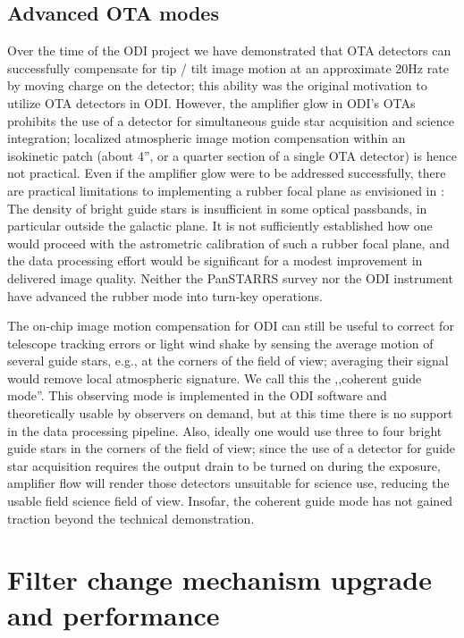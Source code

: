 \documentclass[]{spieman}
\begin{document}
\subsection{Advanced OTA modes}

Over the time of the ODI project we have demonstrated that OTA detectors can
successfully compensate for tip / tilt image motion at an approximate 20Hz rate 
by moving charge on the detector; this ability was the original motivation to  
utilize OTA detectors in ODI.  However, the amplifier glow in ODI's OTAs prohibits
the use of a detector for simultaneous guide star acquisition and science integration;
localized atmospheric image motion compensation within an
isokinetic patch (about 4'', or a quarter section of a single OTA detector) is hence not
practical. Even if the amplifier glow were to be addressed successfully, there are practical
limitations to implementing a rubber focal plane as envisioned in \cite{tonry2002}:
The density of  bright guide stars is insufficient in some  optical passbands,
in particular outside the galactic plane. It is not sufficiently established how
one would proceed with the astrometric calibration of such a rubber focal plane, and the
data processing effort would be significant for a modest improvement in
delivered image quality. Neither the PanSTARRS survey nor the ODI
instrument have advanced the rubber mode into turn-key operations.

The on-chip image motion compensation for ODI can still be useful to correct for telescope tracking 
errors or light wind shake by sensing the average motion of several guide stars, e.g., at the corners of the field 
of view; averaging their signal would remove local atmospheric signature.
We call this the ,,coherent guide mode''. This observing mode is implemented in the ODI
software and theoretically usable by observers on demand, but at this time there is no
support in the  data processing pipeline. Also, ideally one would use three to four bright guide stars in
the corners of the field of view; since the use of a detector for guide star acquisition
requires the output drain to be turned on during the exposure, amplifier flow will render those
detectors unsuitable for science use, reducing the usable field science field of view.
Insofar, the coherent guide mode has not gained traction beyond the technical demonstration. 



\section{Filter change mechanism upgrade and performance}
\end{document}
